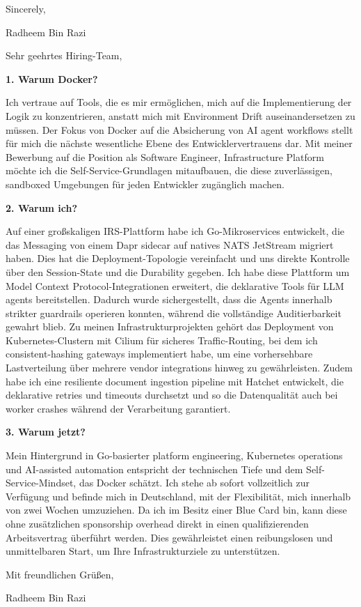 \documentclass[11pt,a4paper]{coverletter}
\begin{document}
\closing{Sincerely,}{Radheem Bin Razi}

\clearpage
{}


\opening{Sehr geehrtes Hiring-Team,}

\vspace{8pt}\noindent\textbf{1. Warum Docker?}\par\vspace{3pt}

Ich vertraue auf Tools, die es mir ermöglichen, mich auf die Implementierung der Logik zu konzentrieren, anstatt mich mit Environment Drift auseinandersetzen zu müssen. Der Fokus von Docker auf die Absicherung von AI agent workflows stellt für mich die nächste wesentliche Ebene des Entwicklervertrauens dar. Mit meiner Bewerbung auf die Position als Software Engineer, Infrastructure Platform möchte ich die Self-Service-Grundlagen mitaufbauen, die diese zuverlässigen, sandboxed Umgebungen für jeden Entwickler zugänglich machen.

\vspace{8pt}\noindent\textbf{2. Warum ich?}\par\vspace{3pt}

Auf einer großskaligen IRS-Plattform habe ich Go-Mikroservices entwickelt, die das Messaging von einem Dapr sidecar auf natives NATS JetStream migriert haben. Dies hat die Deployment-Topologie vereinfacht und uns direkte Kontrolle über den Session-State und die Durability gegeben. Ich habe diese Plattform um Model Context Protocol-Integrationen erweitert, die deklarative Tools für LLM agents bereitstellen. Dadurch wurde sichergestellt, dass die Agents innerhalb strikter guardrails operieren konnten, während die vollständige Auditierbarkeit gewahrt blieb. Zu meinen Infrastrukturprojekten gehört das Deployment von Kubernetes-Clustern mit Cilium für sicheres Traffic-Routing, bei dem ich consistent-hashing gateways implementiert habe, um eine vorhersehbare Lastverteilung über mehrere vendor integrations hinweg zu gewährleisten. Zudem habe ich eine resiliente document ingestion pipeline mit Hatchet entwickelt, die deklarative retries und timeouts durchsetzt und so die Datenqualität auch bei worker crashes während der Verarbeitung garantiert.

\vspace{8pt}\noindent\textbf{3. Warum jetzt?}\par\vspace{3pt}

Mein Hintergrund in Go-basierter platform engineering, Kubernetes operations und AI-assisted automation entspricht der technischen Tiefe und dem Self-Service-Mindset, das Docker schätzt. Ich stehe ab sofort vollzeitlich zur Verfügung und befinde mich in Deutschland, mit der Flexibilität, mich innerhalb von zwei Wochen umzuziehen. Da ich im Besitz einer Blue Card bin, kann diese ohne zusätzlichen sponsorship overhead direkt in einen qualifizierenden Arbeitsvertrag überführt werden. Dies gewährleistet einen reibungslosen und unmittelbaren Start, um Ihre Infrastrukturziele zu unterstützen.

\closing{Mit freundlichen Grüßen,}{Radheem Bin Razi}
\end{document}
